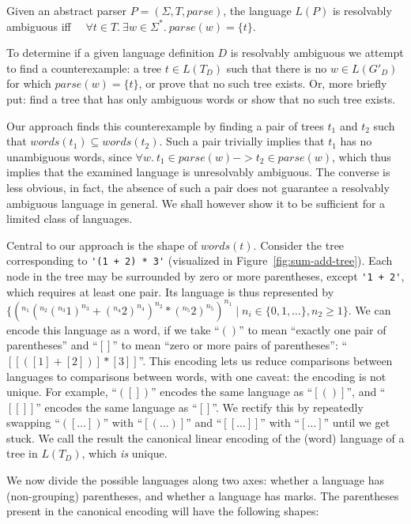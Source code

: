 \documentclass[runningheads]{llncs}
\newcommand{\T}{\Sigma} %
\newcommand{\parse}{\mathit{parse}} %
\newcommand{\words}{\mathit{words}} %
\newcommand{\reqpl}{(}
\newcommand{\reqpr}{)}
\newcommand{\reqp}[1]{\reqpl#1\reqpr}
\newcommand{\pospl}{[}
\newcommand{\pospr}{]}
\newcommand{\posp}[1]{\pospl#1\pospr}
\begin{document}
\begin{lemma}
  Given an abstract parser $P = (\T, T, \parse)$, the language $L(P)$ is resolvably ambiguous iff $\quad\forall t \in T.\ \exists w \in \T^{*}.\ \parse(w) = \{t\}$.
\end{lemma}

\noindent To determine if a given language definition $D$ is resolvably ambiguous we attempt to find a counterexample: a tree $t \in L(T_D)$ such that there is no $w \in L(G'_D)$ for which $\parse(w) = \{t\}$, or prove that no such tree exists. Or, more briefly put: find a tree that has only ambiguous words or show that no such tree exists.

Our approach finds this counterexample by finding a pair of trees $t_1$ and $t_2$ such that $\words(t_1) \subseteq \words(t_2)$. Such a pair trivially implies that $t_1$ has no unambiguous words, since $\forall w.\ t_1 \in \parse(w) -> t_2 \in \parse(w)$, which thus implies that the examined language is unresolvably ambiguous. The converse is less obvious, in fact, the absence of such a pair does not guarantee a resolvably ambiguous language in general. We shall however show it to be sufficient for a limited class of languages.

Central to our approach is the shape of $\words(t)$. Consider the tree corresponding to \verb|'(1 + 2) * 3'| (visualized in Figure~\ref{fig:sum-add-tree}). Each node in the tree may be surrounded by zero or more parentheses, except \verb|'1 + 2'|, which requires at least one pair. Its language is thus represented by $\{(^{n_1}(^{n_2}(^{n_3}1)^{n_3} + (^{n_4}2)^{n_4})^{n_2} * (^{n_5}2)^{n_5})^{n_1} \mid n_i \in \{0, 1, \ldots\}, n_2 \geq 1\}$. We can encode this language as a word, if we take ``$\reqp{}$'' to mean ``exactly one pair of parentheses'' and ``$\posp{}$'' to mean ``zero or more pairs of parentheses'': ``$\posp{\posp{\reqp{\posp{1} + \posp{2}}} * \posp{3}}$''. This encoding lets us reduce comparisons between languages to comparisons between words, with one caveat: the encoding is not unique. For example, ``$\reqp{\posp{}}$'' encodes the same language as ``$\posp{\reqp{}}$'', and ``$\posp{\posp{}}$'' encodes the same language as ``$\posp{}$''. We rectify this by repeatedly swapping ``$\reqp{\posp{\ldots}}$'' with ``$\posp{\reqp{\ldots}}$'' and ``$\posp{\posp{\ldots}}$'' with ``$\posp{\ldots}$'' until we get stuck. We call the result the canonical linear encoding of the (word) language of a tree in $L(T_D)$, which \emph{is} unique.

We now divide the possible languages along two axes: whether a language has (non-grouping) parentheses, and whether a language has marks. The parentheses present in the canonical encoding will have the following shapes:
\end{document}
